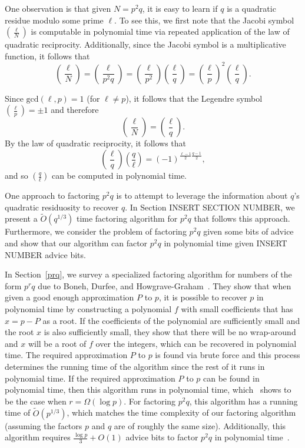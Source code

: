 \documentclass[letterpaper,twocolumn,10pt]{article}
\begin{document}
One observation is that given $N = p^2q$, it is easy to learn if $q$ is a quadratic residue modulo some prime $\ell$. To see this, we first note that the Jacobi symbol $\left(\frac{\ell}{N}\right)$ is computable in polynomial time via repeated application of the law of quadratic reciprocity. Additionally, since the Jacobi symbol is a multiplicative function, it follows that
\[
\left(\frac{\ell}{N}\right) = \left(\frac{\ell}{p^2q}\right) = \left(\frac{\ell}{p^2}\right) \left(\frac{\ell}{q}\right) = \left(\frac{\ell}{p}\right)^2 \left(\frac{\ell}{q}\right).
\]

Since $\text{gcd}(\ell,p) = 1$ (for $\ell \ne p$), it follows that the Legendre symbol $\left(\frac{\ell}{p}\right) = \pm 1$ and therefore
\[
\left(\frac{\ell}{N}\right) = \left(\frac{\ell}{q}\right).
\]
By the law of quadratic reciprocity, it follows that
\[
\left(\frac{\ell}{q}\right) \left(\frac{q}{\ell}\right) = (-1)^{\frac{\ell-1}{2} \frac{q-1}{2}}, 
\]
and so $\left(\frac{q}{\ell}\right)$ can be computed in polynomial time.

One approach to factoring $p^2 q$ is to attempt to leverage the information about $q$'s quadratic residuosity to recover $q$. In Section {\color{red} INSERT SECTION NUMBER}, we present a $\tilde{O}(q^{1/3})$ time factoring algorithm for $p^2 q$ that follows this approach. Furthermore, we consider the problem of factoring $p^2 q$ given some bits of advice and show that our algorithm can factor $p^2 q$ in polynomial time given {\color{red} INSERT NUMBER} advice bits. 

In Section~\ref{prq}, we survey a specialized factoring algorithm for numbers of the form $p^r q$ due to Boneh, Durfee, and Howgrave-Graham~\cite{dan}. They show that when given a good enough approximation $P$ to $p$, it is possible to recover $p$ in polynomial time by constructing a polynomial $f$ with small coefficients that has $x = p - P$ as a root. If the coefficients of the polynomial are sufficiently small and the root $x$ is also sufficiently small, they show that there will be no wrap-around and $x$ will be a root of $f$ over the integers, which can be recovered in polynomial time. The required approximation $P$ to $p$ is found via brute force and this process determines the running time of the algorithm since the rest of it runs in polynomial time. If the required approximation $P$ to $p$ can be found in polynomial time, then this algorithm runs in polynomial time, which~\cite{dan} shows to be the case when $r = \Omega(\log p)$. For factoring $p^2 q$, this algorithm has a running time of $\tilde{O}(p^{1/3})$, which matches the time complexity of our factoring algorithm (assuming the factors $p$ and $q$ are of roughly the same size). Additionally, this algorithm requires $\frac{\log p}{3} + O(1)$ advice bits to factor $p^2 q$ in polynomial time~\cite{dan}. 
\end{document}
